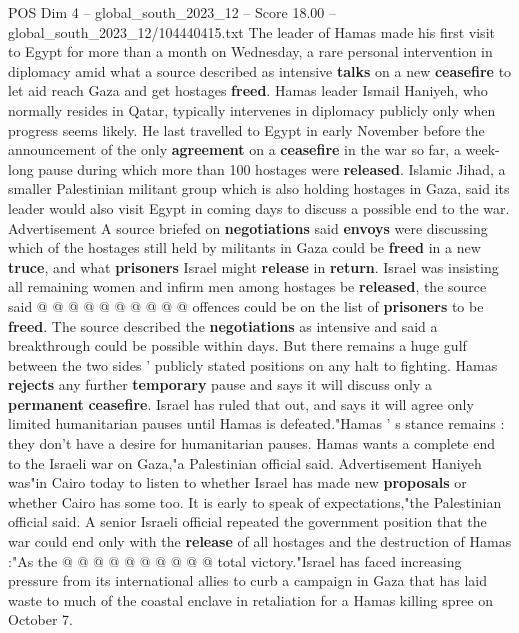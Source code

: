 \begin{textsample}{POS Dim 4 – global\_south\_2023\_12 – Score 18.00 – global\_south\_2023\_12/104440415.txt}  \label{ex:f4_pos_136}
The leader of Hamas made his first visit to Egypt for more than a month on Wednesday, a rare personal intervention in diplomacy amid what a source described as intensive \textbf{talks} on a new \textbf{ceasefire} to let aid reach Gaza and get hostages \textbf{freed}.
Hamas leader Ismail Haniyeh, who normally resides in Qatar, typically intervenes in diplomacy publicly only when progress seems likely.
He last travelled to Egypt in early November before the announcement of the only \textbf{agreement} on a \textbf{ceasefire} in the war so far, a week-long pause during which more than 100 hostages were \textbf{released}.
Islamic Jihad, a smaller Palestinian militant group which is also holding hostages in Gaza, said its leader would also visit Egypt in coming days to discuss a possible end to the war.
Advertisement A source briefed on \textbf{negotiations} said \textbf{envoys} were discussing which of the hostages still held by militants in Gaza could be \textbf{freed} in a new \textbf{truce}, and what \textbf{prisoners} Israel might \textbf{release} in \textbf{return}.
Israel was insisting all remaining women and infirm men among hostages be \textbf{released}, the source said @ @ @ @ @ @ @ @ @ @ offences could be on the list of \textbf{prisoners} to be \textbf{freed}.
The source described the \textbf{negotiations} as intensive and said a breakthrough could be possible within days.
But there remains a huge gulf between the two sides ' publicly stated positions on any halt to fighting.
Hamas \textbf{rejects} any further \textbf{temporary} pause and says it will discuss only a \textbf{permanent} \textbf{ceasefire}.
Israel has ruled that out, and says it will agree only limited humanitarian pauses until Hamas is defeated."Hamas ' s stance remains : they don't have a desire for humanitarian pauses.
Hamas wants a complete end to the Israeli war on Gaza,"a Palestinian official said.
Advertisement Haniyeh was"in Cairo today to listen to whether Israel has made new \textbf{proposals} or whether Cairo has some too.
It is early to speak of expectations,"the Palestinian official said.
A senior Israeli official repeated the government position that the war could end only with the \textbf{release} of all hostages and the destruction of Hamas :"As the @ @ @ @ @ @ @ @ @ @ total victory."Israel has faced increasing pressure from its international allies to curb a campaign in Gaza that has laid waste to much of the coastal enclave in retaliation for a Hamas killing spree on October 7.

\end{textsample}
